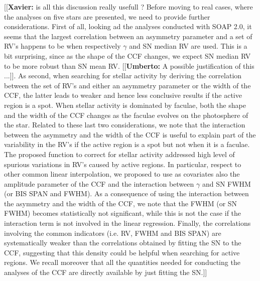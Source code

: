 \documentclass[11pt, oneside]{article}
\newcommand{\xavier}[1]{{\color{blue}[[\textbf{Xavier: }#1]]}}
\newcommand{\umberto}[1]{{\color{green}[[\textbf{Umberto: }#1]]}}
\begin{document}
\xavier{is all this discussion really usefull ? Before moving to real cases, where the analyses on five stars are presented, we need to provide further considerations. First of all, looking ad the analyses conducted with SOAP 2.0, it seems that the largest correlation between an asymmetry parameter and a set of RV's happens to be when respectively $\gamma$ and SN median RV are used. This is a bit surprising, since as the shape of the CCF changes, we expect SN median RV to be more robust than SN mean RV. \umberto{A possible justification of this ...}. As second, when searching for stellar activity by deriving the correlation between the set of RV's and either an asymmetry parameter or the width of the CCF, the latter leads to weaker and hence less conclusive results if the active region is a spot. When stellar activity is dominated by faculae, both the shape and the width of the CCF changes as the faculae evolves on the photosphere of the star. Related to these last two considerations, we note that the interaction between the asymmetry and the width of the CCF is useful to explain part of the variability in the RV's if the active region is a spot but not when it is a faculae. The proposed function to correct for stellar activity addressed high level of spurious variations in RV's caused by active regions. In particular, respect to other common linear interpolation, we proposed to use as covariates also the amplitude parameter of the CCF and the interaction between $\gamma$ and SN FWHM (or BIS SPAN and FWHM). As a consequence of using the interaction between the asymmetry and the width of the CCF, we note that the FWHM (or SN FWHM) becomes statistically not significant, while this is not the case if the interaction term is not involved in the linear regression. Finally, the correlations involving the common indicators (i.e. RV, FWHM and BIS SPAN) are systematically weaker than the correlations obtained by fitting the SN to the CCF, suggesting that this density could be helpful when searching for active regions. We recall moreover that all the quantities needed for conducting the analyses of the CCF are directly available by just fitting the SN.}

\end{document}
